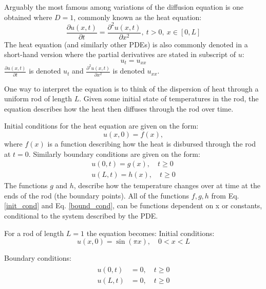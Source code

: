 Arguably the most famous among variations of the diffusion equation is one obtained where $D=1$, commonly known as the heat equation:
\begin{equation}\label{eq:diffu}
    \frac{\partial u(x,t)}{\partial t}=\frac{\partial^2 u(x,t)}{\partial x^2} , \ t>0, \ x\in [0, L]
\end{equation}
The heat equation (and similarly other PDEs) is also commonly denoted in a short-hand version where the partial derivatives are stated in subscript of $u$:  
\begin{equation}
    u_t = u_{xx}
\end{equation}
$\frac{\partial u(x,t)}{\partial t}$ is denoted $u_t$ and $\frac{\partial^2 u(x,t)}{\partial x^2}$ is denoted $u_{xx}$.

One way to interpret the equation is to think of the dispersion of heat through a uniform rod of length $L$. Given some initial state of temperatures in the rod, the equation describes how the heat then diffuses through the rod over time. 

Initial conditions for the heat equation are given on the form: 
\begin{equation}\label{init_cond}
    u(x,0) = f(x),
\end{equation}
where $f(x)$ is a function describing how the heat is disbursed through the rod at $t=0$.
Similarly boundary conditions are given on the form: 
\begin{equation}\label{bound_cond}
    \begin{split}
        u(0, t) = g(x), \quad t \ge 0 \\
        u(L, t) = h(x), \quad t \ge 0
    \end{split}
\end{equation}
The functions $g$ and $h$, describe how the temperature changes over at time at the ends of the rod (the boundary points). 
All of the functions $f, g, h$ from Eq. \ref{init_cond} and Eq. \ref{bound_cond}, can be functions dependent on x or constants, conditional to the system described by the PDE. 

For a rod of length $L = 1$ the equation becomes:
Initial conditions:
\begin{equation}
    u(x, 0) = \sin(\pi x), \quad 0 < x < L
\end{equation}

Boundary conditions:
\begin{align}
\begin{split}
    u(0,t) &= 0, \quad t\geq 0 \\
    u(L,t) &= 0, \quad t\geq 0
\end{split}
\end{align}

